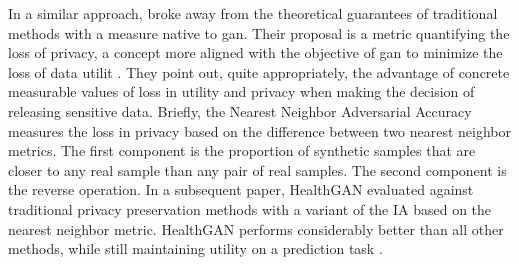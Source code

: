 In a similar approach, \citeauthor{Yale_2020} broke away from the theoretical guarantees of traditional methods with a measure native to \gls{gan}. Their proposal is a metric quantifying the loss of privacy, a concept more aligned with the objective of \gls{gan} to minimize the loss of data utilit \cite{yale:hal-02160496,p2019}. They point out, quite appropriately, the advantage of concrete measurable values of loss in utility and privacy when making the decision of releasing sensitive data. Briefly, the Nearest Neighbor Adversarial Accuracy measures the loss in privacy based on the difference between two nearest neighbor metrics. The  first component is the proportion of synthetic samples that are closer to any real sample than any pair of real samples. The second component is the reverse operation. In a subsequent paper, HealthGAN evaluated against traditional privacy preservation methods with a variant of the IA based on the nearest neighbor metric. HealthGAN performs considerably better than all other methods, while still maintaining utility on a prediction task .


       



